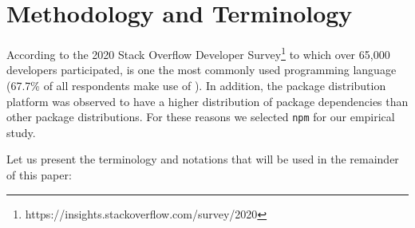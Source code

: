 \section{Methodology and Terminology}
\label{sec:method}
According to the 2020 Stack Overflow Developer Survey\footnote{https://insights.stackoverflow.com/survey/2020} to which over 65,000 developers participated, \js is one the most commonly used programming language (67.7\% of all respondents make use of \js).
In addition, the \np package distribution platform was observed to have a higher distribution of package dependencies than other package distributions\cite{Decan:2019:emse}.
For these reasons we selected \texttt{npm} for our empirical study.

Let us present the terminology and notations that will be used in the remainder of this paper:

